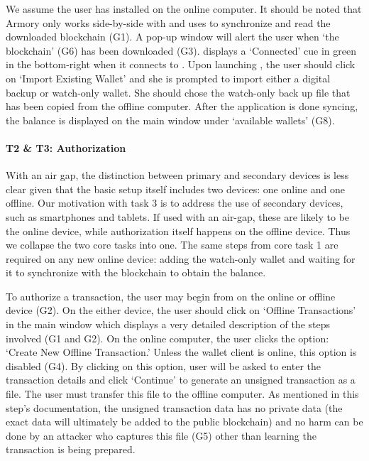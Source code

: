 We assume the user has installed \armory on the online computer. It should be noted that Armory only works side-by-side with \bitcoinclient and uses \bitcoinclient to synchronize and read the downloaded blockchain (G1). A pop-up window will alert the user when `the blockchain' (G6) has been downloaded (G3). \armory displays a `Connected' cue in green in the bottom-right when it connects to \bitcoinclient. Upon launching \armory, the user should click on `Import Existing Wallet' and she is prompted to import either a digital backup or watch-only wallet. She should chose the watch-only back up file that has been copied from the offline computer. After the application is done syncing, the balance is displayed on the main window under `available wallets' (G8).

\paragraph{T2 \& T3: Authorization}

With an air gap, the distinction between primary and secondary devices is less clear given that the basic setup itself includes two devices: one online and one offline. Our motivation with task 3 is to address the use of secondary devices, such as smartphones and tablets. If used with an air-gap, these are likely to be the online device, while authorization itself happens on the offline device. Thus we collapse the two core tasks into one. The same steps from core task 1 are required on any new online device: adding the watch-only wallet and waiting for it to synchronize with the blockchain to obtain the balance.

To authorize a transaction, the user may begin from \armory on the online or offline device (G2). On the either device, the user should click on `Offline Transactions' in the main window which displays a very detailed description of the steps involved (G1 and G2). On the online computer, the user clicks the option: `Create New Offline Transaction.' Unless the wallet client is online, this option is disabled (G4). By clicking on this option, user will be asked to enter the transaction details and click `Continue' to generate an unsigned transaction as a file. The user must transfer this file to the offline computer. As mentioned in this step's documentation, the unsigned transaction data has no private data (the exact data will ultimately be added to the public blockchain) and no harm can be done by an attacker who captures this file (G5) other than learning the transaction is being prepared.

